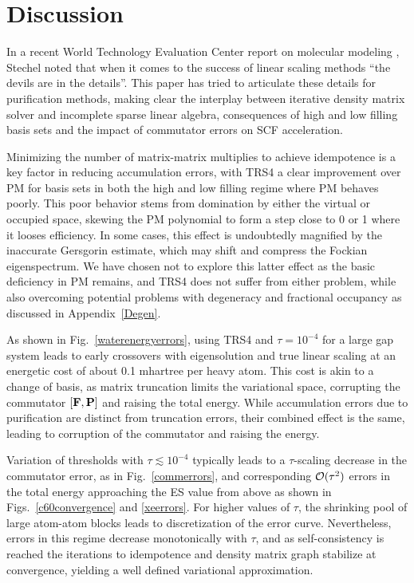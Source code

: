 \commentoutA{\documentclass[prl,aps,twocolumn,showpacs,twocolumngrid,superbib]{revtex4}}
\begin{document}
\section{Discussion}\label{discuss}

In a recent World Technology Evaluation Center report on molecular modeling \cite{WTECMM02}, 
Stechel noted that when it comes to the success of linear scaling  methods 
``the devils are in the details''.  This paper has tried to articulate these details for
purification methods, making clear the interplay between iterative density matrix solver and
incomplete sparse linear algebra, consequences of high and low filling basis sets and the 
impact of commutator errors on SCF acceleration. 

Minimizing the number of matrix-matrix multiplies to achieve idempotence is a key factor in reducing
accumulation errors, with TRS4 a clear improvement over PM for basis sets in both the high and 
low filling regime where PM behaves poorly.  This poor behavior stems from domination by 
either the virtual or occupied space, skewing the PM polynomial to form a step close to 0
or 1 where it looses efficiency.  In some cases, this effect is undoubtedly magnified by the 
inaccurate Gersgorin estimate, which may shift and compress the Fockian eigenspectrum.  We 
have chosen not to explore this latter effect as the basic deficiency in PM remains, and 
TRS4 does not suffer from either problem, while also overcoming potential problems with 
degeneracy and fractional occupancy as discussed in Appendix~\ref{Degen}.

As shown in Fig.~\ref{waterenergyerrors}, using TRS4 and $\tau=10^{-4}$ for a large gap system 
leads to  early crossovers with eigensolution and true linear scaling at an energetic 
cost of about 0.1 mhartree per heavy atom.  This cost is akin to a change of basis, 
as matrix truncation limits the variational space, 
corrupting the commutator $[{\bf F,P}]$ and raising the total energy.  While accumulation 
errors due to purification are distinct from truncation errors, their combined effect is the 
same, leading to corruption of the commutator and raising the energy.   

Variation of thresholds with $\tau \lesssim 10^{-4}$ typically leads to a 
$\tau$-scaling decrease in the commutator error, as in Fig.~\ref{commerrors}, and corresponding
${\cal O}(\tau^2)$ errors in the total energy approaching  the ES value from above as shown
in Figs.~\ref{c60convergence} and \ref{xeerrors}.  For higher values of $\tau$, the 
shrinking pool of large atom-atom blocks leads to discretization of the error curve.  
Nevertheless, errors in this regime decrease monotonically with $\tau$, and as self-consistency 
is reached the iterations to idempotence and density matrix graph stabilize at 
convergence, yielding a well defined variational approximation.
\end{document}
